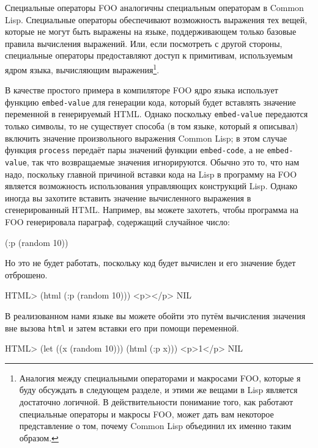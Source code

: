 Специальные операторы FOO аналогичны специальным операторам в Common Lisp. Специальные
операторы обеспечивают возможность выражения тех вещей, которые не могут быть выражены на
языке, поддерживающем только базовые правила вычисления выражений.  Или, если посмотреть с
другой стороны, специальные операторы предоставляют доступ к примитивам, используемым
ядром языка, вычисляющим выражения\footnote{Аналогия между специальными операторами и
  макросами FOO, которые я буду обсуждать в следующем разделе, и этими же вещами в Lisp
  является достаточно логичной.  В действительности понимание того, как работают
  специальные операторы и макросы FOO, может дать вам некоторое представление о том,
  почему Common Lisp объединил их именно таким образом.}.

В качестве простого примера в компиляторе FOO ядро языка использует функцию
\lstinline{embed-value} для генерации кода, который будет вставлять значение переменной в
генерируемый HTML.  Однако поскольку \lstinline{embed-value} передаются только символы, то не
существует способа (в том языке, который я описывал) включить значение произвольного
выражения Common Lisp; в этом случае функция \lstinline{process} передаёт пары значений функции
\lstinline{embed-code}, а не \lstinline{embed-value}, так что возвращаемые значения игнорируются.
Обычно это то, что нам надо, поскольку главной причиной вставки кода на Lisp в программу
на FOO является возможность использования управляющих конструкций Lisp.  Однако иногда
вы захотите вставить значение вычисленного выражения в сгенерированный HTML.  Например, вы
можете захотеть, чтобы программа на FOO генерировала параграф, содержащий случайное число:

\begin{myverb}
(:p (random 10))
\end{myverb}

Но это не будет работать, поскольку код будет вычислен и его значение будет отброшено.

\begin{myverb}
HTML> (html (:p (random 10)))
<p></p>
NIL
\end{myverb}

В реализованном нами языке вы можете обойти это путём вычисления значения вне вызова
\lstinline{html} и затем вставки его при помощи переменной.

\begin{myverb}
HTML> (let ((x (random 10))) (html (:p x)))
<p>1</p>
NIL
\end{myverb}

